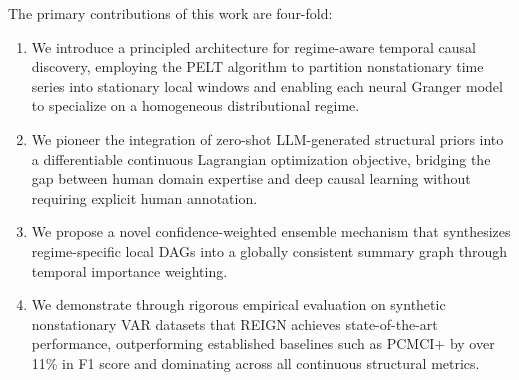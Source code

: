 The primary contributions of this work are four-fold:
\begin{enumerate}
    \item We introduce a principled architecture for regime-aware temporal causal discovery, employing the PELT algorithm to partition nonstationary time series into stationary local windows and enabling each neural Granger model to specialize on a homogeneous distributional regime.
    \item We pioneer the integration of zero-shot LLM-generated structural priors into a differentiable continuous Lagrangian optimization objective, bridging the gap between human domain expertise and deep causal learning without requiring explicit human annotation.
    \item We propose a novel confidence-weighted ensemble mechanism that synthesizes regime-specific local DAGs into a globally consistent summary graph through temporal importance weighting.
    \item We demonstrate through rigorous empirical evaluation on synthetic nonstationary VAR datasets that REIGN achieves state-of-the-art performance, outperforming established baselines such as PCMCI+ by over 11\% in F1 score and dominating across all continuous structural metrics.
\end{enumerate}
